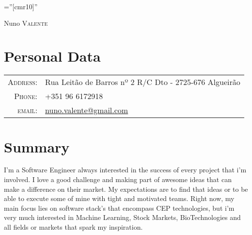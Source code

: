 \documentclass[a4paper,10pt]{article}
\begin{document}
\pagestyle{empty} %

\font\fb=''[cmr10]'' %

\par{\centering
  {\Huge Nuno \textsc{Valente}
}\bigskip\par}

\section{Personal Data}

\begin{tabular}{rl}
    \textsc{Address:}   & Rua Leitão de Barros nº 2 R/C Dto - 2725-676 Algueirão\\
    \textsc{Phone:}     & +351 96 6172918\\
    \textsc{email:}     & \href{mailto:nuno.valente@gmail.com}{nuno.valente@gmail.com} \\
\end{tabular}

\section{Summary}
I'm a Software Engineer always interested in the success of every project that i'm involved. 
I love a good challenge and making part of awesome ideas that can make a difference on their market.
My expectations are to find that ideas or to be able to execute some of mine with tight and motivated teams.
Right now, my main focus lies on software stack's that encompass CEP technologies, but i'm very much interested in Machine Learning, Stock Markets, BioTechnologies and all fields or markets
that spark my inspiration.

\end{document}
